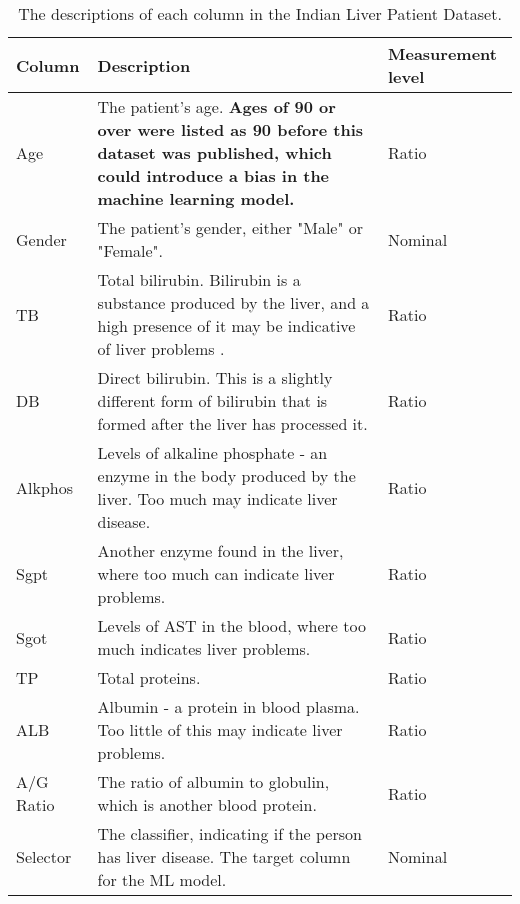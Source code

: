 \begin{table}[H]
    \centering
        \begin{tabular}{ |p{}| p{}| p{}|}
            \hline
            \cellcolor{blue!25}Column & \cellcolor{blue!25}Description & \cellcolor{blue!25}Measurement level\\
            \hline
            Age & The patient's age. \textbf{Ages of 90 or over were listed as 90 before this dataset was published,
            which could introduce a bias in the machine learning model.} 
            & Ratio\\
            \hline
            Gender & The patient's gender, either "Male" or "Female". & Nominal\\
            \hline
            TB & Total bilirubin. Bilirubin is a substance produced by the liver, and a high presence of it may be indicative of
            liver problems \autocite{mayo_clinic_bilirubin_nodate}. & Ratio\\
            \hline
            DB & Direct bilirubin. This is a slightly different form of bilirubin that is formed after the liver has processed it.
            & Ratio\\
            \hline
            Alkphos & Levels of alkaline phosphate - an enzyme in the body produced by the liver. Too much may indicate liver disease. \autocite{clevelandclinic_alkaline_nodate}
            & Ratio\\
            \hline
            Sgpt & Another enzyme found in the liver, where too much can indicate liver problems.
            & Ratio\\
            \hline
            Sgot & Levels of AST in the blood, where too much indicates liver problems.
            & Ratio\\
            \hline
            TP & Total proteins.
            & Ratio\\
            \hline
            ALB & Albumin - a protein in blood plasma. Too little of this may indicate liver problems.
            & Ratio\\
            \hline
            A/G Ratio & The ratio of albumin to globulin, which is another blood protein.
            & Ratio %
            \\
            \hline
            Selector & The classifier, indicating if the person has liver disease. The target column for the ML model.
            & Nominal\\
            \hline
    \end{tabular}
    \caption{The descriptions of each column in the Indian Liver Patient Dataset.}\label{tab:ILPD-Types}
\end{table}

